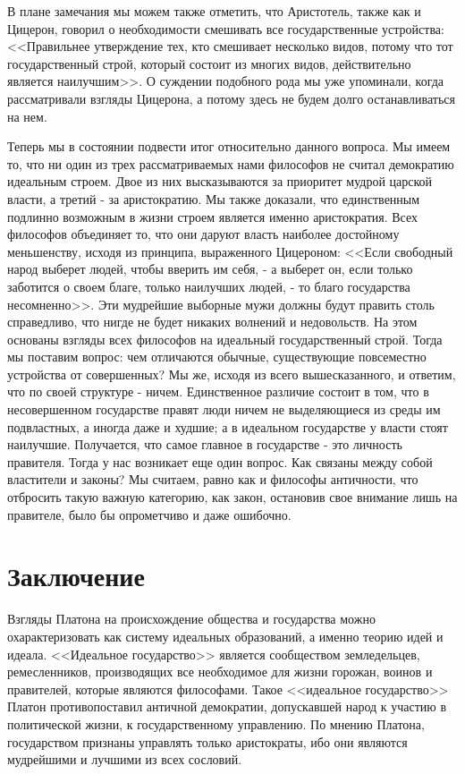	В плане замечания мы можем также отметить, что Аристотель, также как и 
	Цицерон, говорил о необходимости смешивать все государственные устройства: 
	<<Правильнее утверждение тех, кто смешивает несколько видов, потому что 
	тот государственный строй, который состоит из многих видов, действительно 
	является наилучшим>>. О суждении подобного рода мы уже упоминали, когда 
	рассматривали взгляды Цицерона, а потому здесь не будем долго 
	останавливаться на нем.

	Теперь мы в состоянии подвести итог относительно данного вопроса. Мы имеем
	то, что ни один из трех рассматриваемых нами философов не считал демократию
	идеальным строем. Двое из них высказываются за приоритет мудрой царской 
	власти, а третий - за аристократию. Мы также доказали, что единственным 
	подлинно возможным в жизни строем является именно аристократия. Всех 
	философов объединяет то, что они даруют власть наиболее достойному 
	меньшенству, исходя из принципа, выраженного Цицероном: <<Если свободный 
	народ выберет людей, чтобы вверить им себя, - а выберет он, если только 
	заботится о своем благе, только наилучших людей, - то благо государства 
	несомненно>>. Эти мудрейшие выборные мужи должны будут править столь 
	справедливо, что нигде не будет никаких волнений и недовольств. На этом 
	основаны взгляды всех философов на идеальный государственный строй. Тогда 
	мы поставим вопрос: чем отличаются обычные, существующие повсеместно 
	устройства от совершенных? Мы же, исходя из всего вышесказанного, и 
	ответим, что по своей структуре - ничем. Единственное различие состоит в 
	том, что в несовершенном государстве правят люди ничем не выделяющиеся из 
	среды им подвластных, а иногда даже и худшие; а в идеальном государстве у 
	власти стоят наилучшие. Получается, что самое главное в государстве - это 
	личность правителя. Тогда у нас возникает еще один вопрос. Как связаны 
	между собой властители и законы? Мы считаем, равно как и философы 
	античности, что отбросить такую важную категорию, как закон, остановив 
	свое внимание лишь на правителе, было бы опрометчиво и даже ошибочно.

\chapter{Заключение}
	Взгляды Платона на происхождение общества и государства можно 
	охарактеризовать как систему идеальных образований, а именно теорию 
	идей и идеала. <<Идеальное государство>> является сообществом земледельцев, 
	ремесленников, производящих все необходимое для жизни горожан, воинов и 
	правителей, которые являются философами. Такое <<идеальное государство>> 
	Платон противопоставил античной демократии, допускавшей народ к участию 
	в политической жизни, к государственному управлению. По мнению Платона, 
	государством признаны управлять только аристократы, ибо они являются 
	мудрейшими и лучшими из всех сословий.


